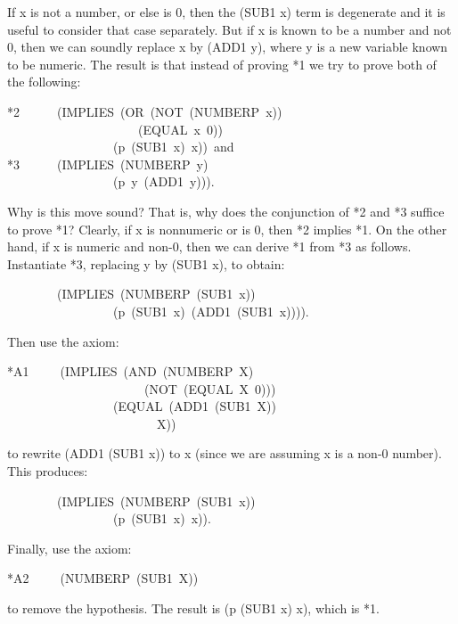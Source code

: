 \documentclass[11pt]{book}
\newenvironment{pubasis}{\begin{flushleft}\ttfamily\small}{\normalsize\rmfamily\end{flushleft}}
\begin{document}
If x is not a number, or else is 0, then the (SUB1 x) term is
degenerate and it is useful to consider that case separately.
But if x is known to be a number and not 0, then we can soundly
replace x by (ADD1 y), where y is a new variable known to be numeric.
The result is that instead of proving *1 we try to prove
both of the following:
\begin{pubasis}
*2~~~~~~(IMPLIES~(OR~(NOT~(NUMBERP~x))\\
~~~~~~~~~~~~~~~~~~~~~(EQUAL~x~0))\\
~~~~~~~~~~~~~~~~~(p~(SUB1~x)~x))~and\\

*3~~~~~~(IMPLIES~(NUMBERP~y)\\
~~~~~~~~~~~~~~~~~(p~y~(ADD1~y))).\\
\end{pubasis}
Why is this move sound?  That is, why does the conjunction of *2
and *3 suffice to prove *1?  Clearly, if x is nonnumeric or is 0,
then *2 implies *1.  On the other hand, if x is numeric and non-0,
then we can derive *1 from *3 as follows.  Instantiate *3,
replacing y by (SUB1 x), to obtain:
\begin{pubasis}
~~~~~~~~(IMPLIES~(NUMBERP~(SUB1~x))\\
~~~~~~~~~~~~~~~~~(p~(SUB1~x)~(ADD1~(SUB1~x)))).\\
\end{pubasis}
Then use the axiom:
\begin{pubasis}
*A1~~~~~(IMPLIES~(AND~(NUMBERP~X)\\
~~~~~~~~~~~~~~~~~~~~~~(NOT~(EQUAL~X~0)))\\
~~~~~~~~~~~~~~~~~(EQUAL~(ADD1~(SUB1~X))\\
~~~~~~~~~~~~~~~~~~~~~~~~X))\\
\end{pubasis}
to rewrite (ADD1 (SUB1 x)) to x (since we are assuming x is a non-0 number).
This produces:
\begin{pubasis}
~~~~~~~~(IMPLIES~(NUMBERP~(SUB1~x))\\
~~~~~~~~~~~~~~~~~(p~(SUB1~x)~x)).\\
\end{pubasis}
Finally, use the axiom:
\begin{pubasis}
*A2~~~~~(NUMBERP~(SUB1~X))\\
\end{pubasis}
to remove the hypothesis.  The result is (p (SUB1 x) x), which is *1.
\end{document}
